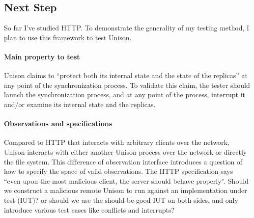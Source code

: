 \documentclass{article}
\theoremstyle{definition}
\begin{document}
\subsection{Next Step}
So far I've studied HTTP.  To demonstrate the generality of my testing method, I
plan to use this framework to test Unison.

\paragraph{Main property to test}
Unison claims to ``protect both its internal state and the state of the
replicas'' at any point of the synchronization process.  To validate this claim,
the tester should launch the synchronization process, and at any point of the
process, interrupt it and/or examine its internal state and the replicas.

\paragraph{Observations and specifications}
Compared to HTTP that interacts with arbitrary clients over the network, Unison
interacts with either another Unison process over the network or directly the
file system.  This difference of observation interface introduces a question of
how to specify the space of valid observations.  The HTTP specification says
``even upon the most malicious client, the server should behave properly''.
Should we construct a malicious remote Unison to run against an implementation
under test (IUT)?  or should we use the should-be-good IUT on both sides, and
only introduce various test cases like conflicts and interrupts?
\end{document}

